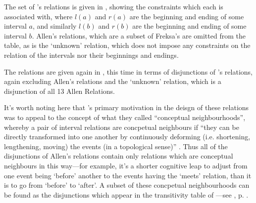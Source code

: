 \documentclass[a4paper,12pt,leqno,twoside]{article}
\begin{document}
The set of \citet{Freksa1992}'s relations is given in , showing the constraints which each is associated with, where $l(a)$ and $r(a)$ are the beginning and ending of some interval $a$, and similarly $l(b)$ and $r(b)$ are the beginning and ending of some interval $b$. Allen's relations, which are a subset of Freksa's are omitted from the table, as is the `unknown' relation, which does not impose any constraints on the relation of the intervals nor their beginnings and endings.

The relations are given again in , this time in terms of disjunctions of \citet{allen1983maintaining}'s relations, again excluding Allen's relations and the `unknown' relation, which is a disjunction of all 13 Allen Relations.

It's worth noting here that \citet{Freksa1992}'s primary motivation in the deisgn of these relations was to appeal to the concept of what they called ``conceptual neighbourhoods'', whereby a pair of interval relations are concpetual neighbours if ``they can be directly transformed into one another by continuously deforming (i.e. shortening, lengthening, moving) the events (in a topological sense)'' \citep[p. 206]{Freksa1992}. Thus all of the disjunctions of Allen's relations contain only relations which are conceptual neighbours in this way---for example, it's a shorter cognitive leap to adjust from one event being `before' another to the events having the `meets' relation, than it is to go from `before' to `after'. A subset of these concpetual neighbourhoods can be found as the disjunctions which appear in the transitivity table of \citet[p. 836]{allen1983maintaining}---see , p. \pageref{tab:allen-trans-table}.
\end{document}
